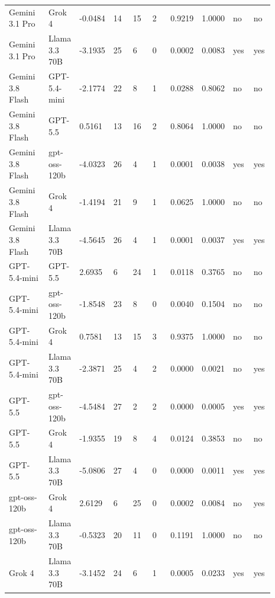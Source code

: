 \begin{landscape}
\begin{longtable}{p{0.162\linewidth}p{0.081\linewidth}p{0.081\linewidth}p{0.081\linewidth}p{0.081\linewidth}p{0.081\linewidth}p{0.081\linewidth}p{0.081\linewidth}p{0.081\linewidth}p{0.081\linewidth}}
Gemini 3.1 Pro & Grok 4 & -0.0484 & 14 & 15 & 2 & 0.9219 & 1.0000 & no & no \\
Gemini 3.1 Pro & Llama 3.3 70B & -3.1935 & 25 & 6 & 0 & 0.0002 & 0.0083 & yes & yes \\
Gemini 3.8 Flash & GPT-5.4-mini & -2.1774 & 22 & 8 & 1 & 0.0288 & 0.8062 & no & no \\
Gemini 3.8 Flash & GPT-5.5 & 0.5161 & 13 & 16 & 2 & 0.8064 & 1.0000 & no & no \\
Gemini 3.8 Flash & gpt-oss-120b & -4.0323 & 26 & 4 & 1 & 0.0001 & 0.0038 & yes & yes \\
Gemini 3.8 Flash & Grok 4 & -1.4194 & 21 & 9 & 1 & 0.0625 & 1.0000 & no & no \\
Gemini 3.8 Flash & Llama 3.3 70B & -4.5645 & 26 & 4 & 1 & 0.0001 & 0.0037 & yes & yes \\
GPT-5.4-mini & GPT-5.5 & 2.6935 & 6 & 24 & 1 & 0.0118 & 0.3765 & no & no \\
GPT-5.4-mini & gpt-oss-120b & -1.8548 & 23 & 8 & 0 & 0.0040 & 0.1504 & no & no \\
GPT-5.4-mini & Grok 4 & 0.7581 & 13 & 15 & 3 & 0.9375 & 1.0000 & no & no \\
GPT-5.4-mini & Llama 3.3 70B & -2.3871 & 25 & 4 & 2 & 0.0000 & 0.0021 & no & yes \\
GPT-5.5 & gpt-oss-120b & -4.5484 & 27 & 2 & 2 & 0.0000 & 0.0005 & yes & yes \\
GPT-5.5 & Grok 4 & -1.9355 & 19 & 8 & 4 & 0.0124 & 0.3853 & no & no \\
GPT-5.5 & Llama 3.3 70B & -5.0806 & 27 & 4 & 0 & 0.0000 & 0.0011 & yes & yes \\
gpt-oss-120b & Grok 4 & 2.6129 & 6 & 25 & 0 & 0.0002 & 0.0084 & no & yes \\
gpt-oss-120b & Llama 3.3 70B & -0.5323 & 20 & 11 & 0 & 0.1191 & 1.0000 & no & no \\
Grok 4 & Llama 3.3 70B & -3.1452 & 24 & 6 & 1 & 0.0005 & 0.0233 & yes & yes \\
\bottomrule
\end{longtable}
\normalsize
\end{landscape}
